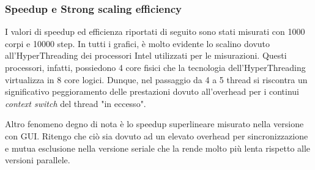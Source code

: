 \documentclass[12pt,a4paper,oneside]{article}
\begin{document}
	\subsubsection{Speedup e Strong scaling efficiency}
	I valori di speedup ed efficienza riportati di seguito sono stati misurati con 1000 corpi e 10000 step. In tutti i grafici, è molto evidente lo scalino dovuto all'HyperThreading dei processori Intel utilizzati per le misurazioni. Questi processori, infatti, possiedono 4 core fisici che la tecnologia dell'HyperThreading virtualizza in 8 core logici. Dunque, nel passaggio da 4 a 5 thread si riscontra un significativo peggioramento delle prestazioni dovuto all'overhead per i continui \textit{context switch} del thread "in eccesso".
	
	Altro fenomeno degno di nota è lo speedup superlineare misurato nella versione con GUI. Ritengo che ciò sia dovuto ad un elevato overhead per sincronizzazione e mutua esclusione nella versione seriale che la rende molto più lenta rispetto alle versioni parallele.
	
\end{document}
